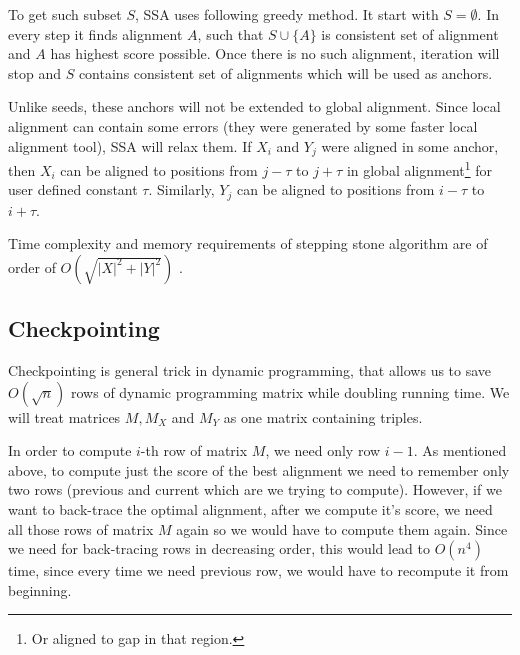 To get such subset $S$, SSA uses following greedy method. It start with
$S=\emptyset$. In every step it finds alignment $A$, such that $S\cup\{A\}$ is
consistent set of alignment and $A$ has highest score possible. Once there is no
such alignment, iteration will stop and $S$ contains consistent set of
alignments which will be used as anchors.

Unlike seeds, these anchors will not be extended to global alignment. Since
local alignment can contain some errors (they were generated by some faster
local alignment tool), SSA will relax them. If $X_i$ and $Y_j$ were aligned in
some anchor, then $X_i$ can be aligned to positions from $j-\tau$ to $j+\tau$ in
global alignment\footnote{Or aligned to gap in that region.} for user defined
constant $\tau$. Similarly, $Y_j$ can be aligned to positions from $i-\tau$ to
$i+\tau$.

Time complexity and memory requirements of stepping stone algorithm are of order
of $O(\sqrt{|X|^2+|Y|^2})$ \cite{Meyer2002}.







\subsection{Checkpointing}

Checkpointing is general trick in dynamic programming, that allows us to save
$O(\sqrt n)$ rows of dynamic programming matrix while doubling running time.
We will treat matrices $M,M_X$ and $M_Y$ as one matrix containing triples.

In order to compute $i$-th row of matrix $M$, we need only row
$i-1$. As mentioned above, to compute just the score of the best alignment we
need to remember only two rows (previous and current which are we trying to
compute). However, if we want to back-trace the optimal alignment, after we
compute it's score, we need all those rows of matrix $M$ again so we would have
to compute them again. Since we need for back-tracing rows in decreasing order,
this would lead to $O(n^4)$ time, since every time we need previous row, we
would have to recompute it from beginning.

